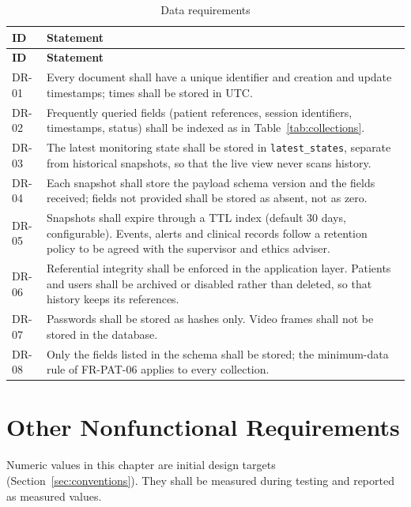 \documentclass[a4paper,11pt]{scrreprt}
\makeatletter
\newcommand{\code}[1]{\texttt{#1}}
\newenvironment{idtable}[1]{%
  \small
  \begin{longtable}{@{}>{\ttfamily\footnotesize}p{1.9cm}>{\raggedright\arraybackslash}p{13.2cm}@{}}
  \caption{#1}\\
  \toprule \textbf{ID} & \textbf{Statement}\\ \midrule
  \endfirsthead
  \toprule \textbf{ID} & \textbf{Statement}\\ \midrule
  \endhead
  \bottomrule
  \endfoot
}{%
  \end{longtable}\normalsize
}
\newcommand{\idr}[2]{#1 & #2 \\ \midrule}
\makeatother
\begin{document}
\begin{idtable}{Data requirements}
\idr{DR-01}{Every document shall have a unique identifier and creation and update timestamps; times shall be stored in UTC.}
\idr{DR-02}{Frequently queried fields (patient references, session identifiers, timestamps, status) shall be indexed as in Table~\ref{tab:collections}.}
\idr{DR-03}{The latest monitoring state shall be stored in \code{latest_states}, separate from historical snapshots, so that the live view never scans history.}
\idr{DR-04}{Each snapshot shall store the payload schema version and the fields received; fields not provided shall be stored as absent, not as zero.}
\idr{DR-05}{Snapshots shall expire through a TTL index (default 30 days, configurable). Events, alerts and clinical records follow a retention policy to be agreed with the supervisor and ethics adviser.}
\idr{DR-06}{Referential integrity shall be enforced in the application layer. Patients and users shall be archived or disabled rather than deleted, so that history keeps its references.}
\idr{DR-07}{Passwords shall be stored as hashes only. Video frames shall not be stored in the database.}
\idr{DR-08}{Only the fields listed in the schema shall be stored; the minimum-data rule of FR-PAT-06 applies to every collection.}
\end{idtable}

\chapter{Other Nonfunctional Requirements}
Numeric values in this chapter are initial design targets (Section~\ref{sec:conventions}). They shall be measured during testing and reported as measured values.
\end{document}
